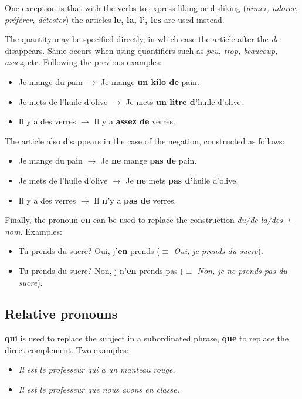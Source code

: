 \documentclass{epflnotes}
\begin{document}
One exception is that with the verbs to express liking or disliking (\textit{aimer, adorer, préférer, détester}) the articles \textbf{le, la, l', les} are used instead.

The quantity may be specified directly, in which case the article after the \textit{de} disappears. Same occurs when using quantifiers such as \textit{peu, trop, beaucoup, assez}, etc. Following the previous examples:

\begin{itemize}
\item Je mange du pain $\to$ Je mange \textbf{un kilo de} pain.
\item Je mets de l'huile d'olive $\to$ Je mets \textbf{un litre d'}huile d'olive.
\item Il y a des verres $\to$ Il y a \textbf{assez de} verres.
\end{itemize}

The article also disappears in the case of the negation, constructed as follows:

\begin{itemize}
\item Je mange du pain $\to$ Je \textbf{ne} mange \textbf{pas de} pain.
\item Je mets de l'huile d'olive $\to$ Je \textbf{ne} mets \textbf{pas d'}huile d'olive.
\item Il y a des verres $\to$ Il \textbf{n'}y a \textbf{pas de} verres.
\end{itemize}

Finally, the pronoun \textbf{en} can be used to replace the construction \textit{du/de la/des + nom}. Examples:

\begin{itemize}
\item Tu prends du sucre? Oui, j\textbf{'en} prends (\textit{$\equiv$ Oui, je prends du sucre}).
\item Tu prends du sucre? Non, j n\textbf{'en} prends pas (\textit{$\equiv$ Non, je ne prends pas du sucre}).
\end{itemize}

\subsection{Relative pronouns}

\textbf{qui} is used to replace the subject in a subordinated phrase, \textbf{que} to replace the direct complement. Two examples:

\begin{itemize}
\item \textit{Il est le professeur qui a un manteau rouge.}
\item \textit{Il est le professeur que nous avons en classe.}
\end{itemize}
\end{document}

